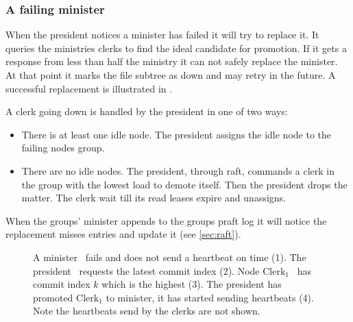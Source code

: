 \subsubsection*{A failing minister}
When the president notices a minister has failed it will try to replace it. It queries the ministries clerks to find the ideal candidate for promotion. If it gets a response from less than half the ministry it can not safely replace the minister. At that point it marks the file subtree as down and may retry in the future. A successful replacement is illustrated in .

A clerk going down is handled by the president in one of two ways:
\begin{itemize}
	\item There is at least one idle node. The president assigns the idle node to the failing nodes group. 
	\item There are no idle nodes. The president, through raft, commands a clerk in the group with the lowest load to demote itself. Then the president drops the matter. The clerk wait till its read leases expire and unassigns.
\end{itemize}
%
When the groups' minister appends to the groups \ac{praft} log it will notice the replacement misses entries and update it (see \cref{sec:raft}).

\begin{figure}[htbp]
	\centering
	
	\caption{A minister~\amdsLeg{} fails and does not send a heartbeat on time (1). The president~\presidentLeg{} requests the latest commit index (2). Node $\text{Clerk}_1$~\cmdsLeg{} has commit index $k$ which is the highest (3). The president has promoted $\text{Clerk}_1$ to minister, it has started sending heartbeats (4). Note the heartbeats send by the clerks are not shown.}
	\label{fig:appoint}
\end{figure}
%
